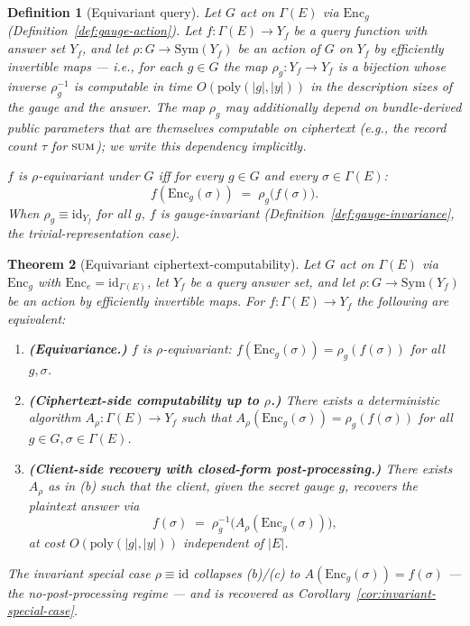 \documentclass[11pt,letterpaper]{article}
\newtheorem{theorem}{Theorem}[section]
\newtheorem{definition}[theorem]{Definition}
\begin{document}
\begin{definition}[Equivariant query]
\label{def:equivariant-query}
Let $G$ act on $\Gamma(E)$ via $\mathrm{Enc}_g$
(Definition~\ref{def:gauge-action}). Let $f: \Gamma(E) \to Y_f$
be a query function with answer set $Y_f$, and let
$\rho: G \to \mathrm{Sym}(Y_f)$ be an action of $G$ on $Y_f$ by
efficiently invertible maps --- i.e., for each $g \in G$ the map
$\rho_g: Y_f \to Y_f$ is a bijection whose inverse $\rho_g^{-1}$
is computable in time $O(\mathrm{poly}(|g|, |y|))$ in the
description sizes of the gauge and the answer. The map $\rho_g$
may additionally depend on bundle-derived public parameters that
are themselves computable on ciphertext (e.g., the record count
$\tau$ for $\textsc{sum}$); we write this dependency implicitly.

$f$ is \emph{$\rho$-equivariant under $G$} iff for every
$g \in G$ and every $\sigma \in \Gamma(E)$:
\[
f(\mathrm{Enc}_g(\sigma)) \;=\; \rho_g\bigl(f(\sigma)\bigr).
\]
When $\rho_g \equiv \mathrm{id}_{Y_f}$ for all $g$, $f$ is
\emph{gauge-invariant} (Definition~\ref{def:gauge-invariance},
the trivial-representation case).
\end{definition}

\begin{theorem}[Equivariant ciphertext-computability]
\label{thm:equivariance}
Let $G$ act on $\Gamma(E)$ via $\mathrm{Enc}_g$ with
$\mathrm{Enc}_e = \mathrm{id}_{\Gamma(E)}$, let $Y_f$ be a query
answer set, and let $\rho: G \to \mathrm{Sym}(Y_f)$ be an action
by efficiently invertible maps. For $f: \Gamma(E) \to Y_f$ the
following are equivalent:
\begin{enumerate}[label=(\alph*),nosep]
\item \textbf{(Equivariance.)} $f$ is $\rho$-equivariant:
  $f(\mathrm{Enc}_g(\sigma)) = \rho_g(f(\sigma))$ for all
  $g, \sigma$.
\item \textbf{(Ciphertext-side computability up to $\rho$.)}
  There exists a deterministic algorithm
  $A_\rho: \Gamma(E) \to Y_f$ such that
  $A_\rho(\mathrm{Enc}_g(\sigma)) = \rho_g(f(\sigma))$ for all
  $g \in G, \sigma \in \Gamma(E)$.
\item \textbf{(Client-side recovery with closed-form
  post-processing.)} There exists $A_\rho$ as in (b) such that
  the client, given the secret gauge $g$, recovers the plaintext
  answer via
  \[
  f(\sigma) \;=\; \rho_g^{-1}\!\bigl(A_\rho(\mathrm{Enc}_g(\sigma))\bigr),
  \]
  at cost $O(\mathrm{poly}(|g|, |y|))$ \emph{independent of $|E|$}.
\end{enumerate}
The invariant special case $\rho \equiv \mathrm{id}$ collapses
(b)/(c) to $A(\mathrm{Enc}_g(\sigma)) = f(\sigma)$ --- the
no-post-processing regime --- and is recovered as
Corollary~\ref{cor:invariant-special-case}.
\end{theorem}
\end{document}
